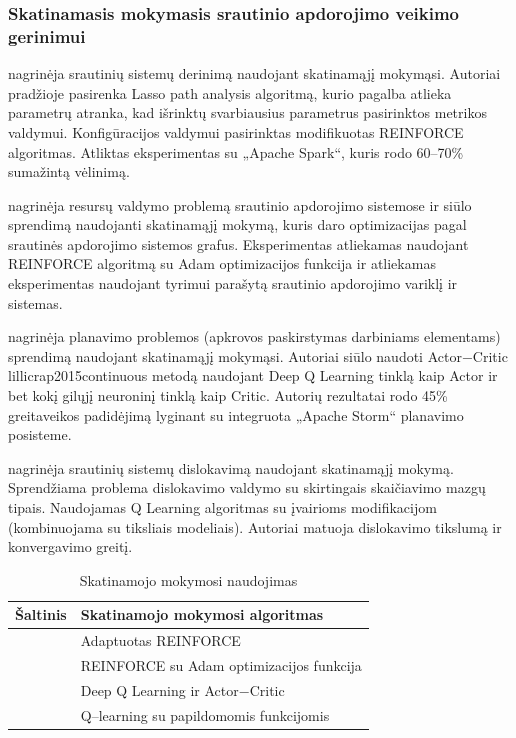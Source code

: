 \documentclass{VUMIFPSbakalaurinis}
\begin{document}
\subsubsection{Skatinamasis mokymasis srautinio apdorojimo veikimo gerinimui}

\cite{vaquero2018autotuning} nagrinėja srautinių sistemų derinimą naudojant skatinamąjį mokymąsi. Autoriai pradžioje pasirenka Lasso path analysis algoritmą, kurio pagalba atlieka parametrų atranka, kad išrinktų svarbiausius parametrus pasirinktos metrikos valdymui. Konfigūracijos valdymui pasirinktas modifikuotas REINFORCE algoritmas. Atliktas eksperimentas su „Apache Spark“, kuris rodo 60–70\% sumažintą vėlinimą.

\cite{ni2019generalizable} nagrinėja resursų valdymo problemą srautinio apdorojimo sistemose ir siūlo sprendimą naudojanti skatinamąjį mokymą, kuris daro optimizacijas pagal srautinės apdorojimo sistemos grafus. Eksperimentas atliekamas naudojant REINFORCE \cite{williams1992simple} algoritmą su Adam optimizacijos funkcija \cite{kingma2014adam} ir atliekamas eksperimentas naudojant tyrimui parašytą srautinio apdorojimo variklį ir sistemas. 

\cite{Li2018Model} nagrinėja planavimo problemos (apkrovos paskirstymas darbiniams elementams) sprendimą naudojant skatinamąjį mokymąsi. Autoriai siūlo naudoti Actor−Critic {lillicrap2015continuous} metodą naudojant Deep Q Learning  \cite{mnih2015human} tinklą kaip Actor ir bet kokį gilųjį neuroninį tinklą kaip Critic. Autorių rezultatai rodo 45\% greitaveikos padidėjimą lyginant su integruota „Apache Storm“ planavimo posisteme. 

\cite{Russo2019Reinforcement} nagrinėja srautinių sistemų dislokavimą naudojant skatinamąjį mokymą. Sprendžiama problema dislokavimo valdymo su skirtingais skaičiavimo mazgų tipais. Naudojamas Q Learning algoritmas su įvairioms modifikacijom (kombinuojama su tiksliais modeliais). Autoriai matuoja dislokavimo tikslumą ir konvergavimo greitį. 

\begin{table}[H]
    \centering
    \caption{Skatinamojo mokymosi naudojimas}
    \begin{tabular}{|l|l|}
    \hline
    Šaltinis                         & Skatinamojo mokymosi algoritmas    \\ \hline
    \cite{vaquero2018autotuning}     & Adaptuotas REINFORCE \cite{williams1992simple}        \\ \hline
    \cite{ni2019generalizable}       & REINFORCE \cite{williams1992simple}  su Adam optimizacijos funkcija \cite{kingma2014adam}     \\ \hline
    \cite{Li2018Model}               & Deep Q Learning \cite{mnih2015human} ir Actor−Critic \cite{lillicrap2015continuous} \\ \hline
    \cite{Russo2019Reinforcement}    & Q–learning \cite{mnih2015human} su papildomomis funkcijomis \\ \hline
    \end{tabular}
    \label{ml–usage}
\end{table}
\end{document}
